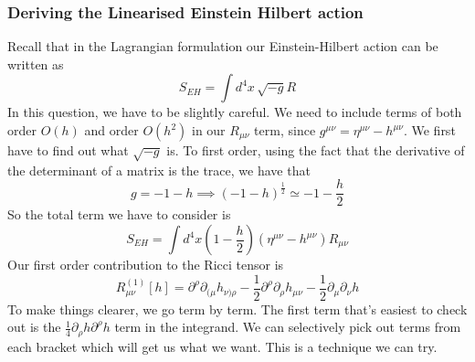\documentclass[11pt, a4paper]{article}   	%
\theoremstyle{slplain}
\begin{document}
\subsubsection{Deriving the Linearised Einstein Hilbert action} 
Recall that in the Lagrangian formulation 
our Einstein-Hilbert action can be written as 
\[
S_{ EH  } = \int d ^ 4 x \, \sqrt{  - g }  R 
\] In this question, 
we have to be slightly careful. 
We need to include terms of both order $ O \left(  h    \right) $ 
and order $ O \left( h ^ 2  \right)  $ in our $ R _{ \mu \nu } $ term, 
since $ g ^{ \mu \nu } = \eta ^{ \mu \nu }  - h ^{ \mu \nu } $. 
We first have to find out what $ \sqrt{  - g}  $ is.
To first order, using the fact that the derivative 
of the determinant of a matrix is the trace, we have that 
\[
g =   - 1  - h \implies \left( -1 - h  \right)^{ \frac{1}{2 } }  \simeq - 1  - \frac{h}{2 } 
\] So the total term 
we have to consider is 
\[
S_{ EH }  = \int d ^ 4 x \left( 1 - \frac{h}{2 } \right) 
\left( \eta^{ \mu \nu }  - h ^{ \mu \nu }  \right) R _{ \mu \nu } \] 
Our first order contribution to the 
Ricci tensor is 
\[
	R_{ \mu \nu } ^{ \left(  1  \right)  } \left[  h  \right]   = 
	\partial  ^ \rho \partial  _{ ( \mu } h _{ \nu  ) \rho 	  }  - 
	\frac{1}{2 } \partial  ^ \rho 	\partial  _ \rho h _{ \mu \nu } 
	 - \frac{1}{2 } \partial  _ \mu \partial  _ \nu h
\] To make things clearer, we go term by term.
The first term that's easiest to check out 
is the $  \frac{1}{4 }\partial  _ \rho h \partial  ^ \rho h  $ 
term in the integrand. We can 
selectively pick out terms from each bracket 
which will get us what we want. This is 
a technique we can try. 
\end{document}
